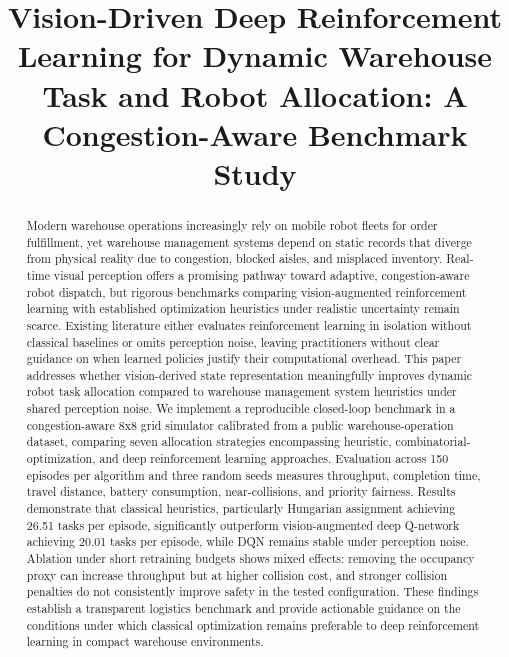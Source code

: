 \documentclass[conference]{IEEEtran}
\begin{document}
\title{Vision-Driven Deep Reinforcement Learning for Dynamic Warehouse Task and Robot Allocation: A Congestion-Aware Benchmark Study}

\author{
\and
{}
}

\maketitle

\begin{abstract}
Modern warehouse operations increasingly rely on mobile robot fleets for order fulfillment, yet warehouse management systems depend on static records that diverge from physical reality due to congestion, blocked aisles, and misplaced inventory.
Real-time visual perception offers a promising pathway toward adaptive, congestion-aware robot dispatch, but rigorous benchmarks comparing vision-augmented reinforcement learning with established optimization heuristics under realistic uncertainty remain scarce.
Existing literature either evaluates reinforcement learning in isolation without classical baselines or omits perception noise, leaving practitioners without clear guidance on when learned policies justify their computational overhead.
This paper addresses whether vision-derived state representation meaningfully improves dynamic robot task allocation compared to warehouse management system heuristics under shared perception noise.
We implement a reproducible closed-loop benchmark in a congestion-aware 8x8 grid simulator calibrated from a public warehouse-operation dataset, comparing seven allocation strategies encompassing heuristic, combinatorial-optimization, and deep reinforcement learning approaches.
Evaluation across 150 episodes per algorithm and three random seeds measures throughput, completion time, travel distance, battery consumption, near-collisions, and priority fairness.
Results demonstrate that classical heuristics, particularly Hungarian assignment achieving 26.51 tasks per episode, significantly outperform vision-augmented deep Q-network achieving 20.01 tasks per episode, while DQN remains stable under perception noise.
Ablation under short retraining budgets shows mixed effects: removing the occupancy proxy can increase throughput but at higher collision cost, and stronger collision penalties do not consistently improve safety in the tested configuration.
These findings establish a transparent logistics benchmark and provide actionable guidance on the conditions under which classical optimization remains preferable to deep reinforcement learning in compact warehouse environments.
\end{abstract}
\end{document}

